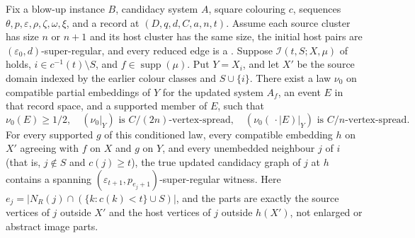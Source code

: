 \begin{lemma}
Fix a blow-up instance $B$, candidacy system $A$, square colouring $c$,
sequences $\theta,p,\varepsilon,\rho,\zeta,\omega,\xi$, and a
 record at $(D,q,d,C,a,n,t)$.
Assume each source cluster has size $n$ or $n+1$ and its host cluster
has the same size, the initial host pairs are
$(\varepsilon_0,d)$-super-regular, and every reduced edge is a
. Suppose
\(\mathcal I(t,S;X,\mu)\) of  holds,
$i\in c^{-1}(t)\setminus S$, and $f\in\operatorname{supp}(\mu)$.
Put $Y=X_i$, and let $X'$ be the source domain indexed by the earlier
colour classes and $S\cup\{i\}$.
There exist a law $\nu_0$ on compatible partial embeddings of $Y$ for
the updated system $A_f$, an event $E$ in that record space, and a
supported member of $E$, such that
\[
\nu_0(E)\ge1/2,\quad
(\nu_0|_Y)\text{ is }C/(2n)\text{-vertex-spread},\quad
(\nu_0(\,\cdot\mid E)|_Y)\text{ is }C/n\text{-vertex-spread}.
\]
For every supported $g$ of this conditioned law, every compatible
embedding $h$ on $X'$ agreeing with $f$ on $X$ and $g$ on $Y$, and every
unembedded neighbour $j$ of $i$ (that is, $j\notin S$ and $c(j)\ge t$),
the true updated candidacy graph of $j$ at $h$ contains a spanning
$(\varepsilon_{t+1},p_{e_j+1})$-super-regular witness. Here
$e_j=|N_R(j)\cap(\{k:c(k)<t\}\cup S)|$, and the parts are exactly
the source vertices of $j$ outside $X'$ and the host vertices of $j$
outside $h(X')$, not enlarged or abstract image parts.
\end{lemma}
